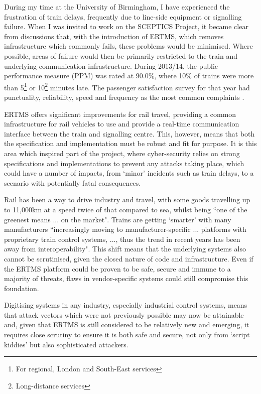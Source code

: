 \documentclass[twoside,11pt,a4paper]{article}
\begin{document}
During my time at the University of Birmingham, I have experienced the frustration of train delays, frequently due to line-side equipment or signalling failure. When I was invited to work on the SCEPTICS Project, it became clear from discussions that, with the introduction of ERTMS, which removes infrastructure which commonly fails, these problems would be minimised. Where possible, areas of failure would then be primarily restricted to the train and underlying communication infrastructure. During 2013/14, the public performance measure (PPM) was rated at 90.0\%, where 10\% of trains were more than 5\footnote{For regional, London and South-East services} or 10\footnote{Long-distance services} minutes late. The passenger satisfaction survey for that year had punctuality, reliability, speed and frequency as the most common complaints \citep[p. 3]{RailExecutive14a}.

ERTMS offers significant improvements for rail travel, providing a common infrastructure for rail vehicles to use and provide a real-time communication interface between the train and signalling centre. This, however, means that both the specification and implementation must be robust and fit for purpose. It is this area which inspired part of the project, where cyber-security relies on strong specifications and implementations to prevent any attacks taking place, which could have a number of impacts, from `minor' incidents such as train delays, to a scenario with potentially fatal consequences.

Rail has been a way to drive industry and travel, with some goods travelling up to 11,000km at a speed twice of that compared to sea, whilst being ``one of the greenest means ... on the market"\citep{EuropeanCommission13a}. Trains are getting `smarter' with many manufacturers ``increasingly moving to manufacturer-specific ... platforms with proprietary train control systems, ..., thus the trend in recent years has been away from interoperability"\citep[pp. 13]{DfT15a}. This shift means that the underlying systems also cannot be scrutinised, given the closed nature of code and infrastructure. Even if the ERTMS platform could be  proven to be safe, secure and immune to a majority of threats, flaws in vendor-specific systems could still compromise this foundation.

Digitising systems in any industry, especially industrial control systems, means that attack vectors which were not previously possible may now be attainable and, given that ERTMS is still considered to be relatively new and emerging, it requires close scrutiny to ensure it is both safe and secure, not only from `script kiddies' but also sophisticated attackers.
\end{document}
